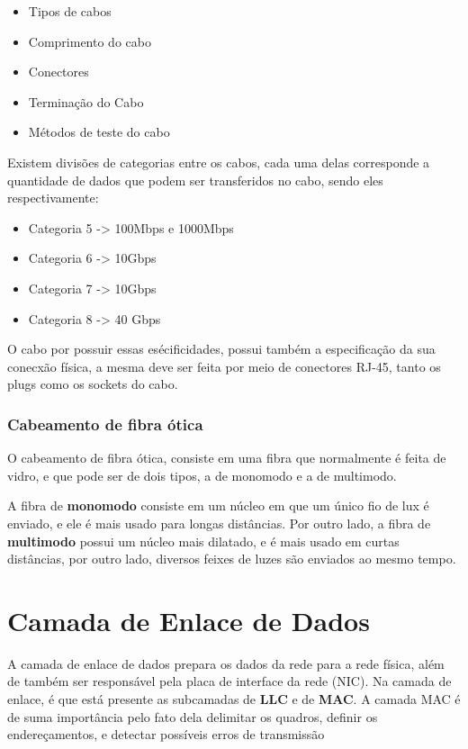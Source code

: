 \documentclass[12pt a4paper]{paper}
\begin{document}
\begin{itemize}
  \item Tipos de cabos 
  \item Comprimento do cabo 
  \item Conectores 
  \item Terminação do Cabo 
  \item Métodos de teste do cabo
\end{itemize}

Existem divisões de categorias entre os cabos, cada uma 
delas corresponde a quantidade de dados que podem ser 
transferidos no cabo, sendo eles respectivamente: 

\begin{itemize}
  \item Categoria 5 -> 100Mbps e 1000Mbps
  \item Categoria 6 -> 10Gbps
  \item Categoria 7 -> 10Gbps 
  \item Categoria 8 -> 40 Gbps 
\end{itemize}

O cabo por possuir essas esécificidades, possui também a 
especificação da sua conecxão física, a mesma deve ser 
feita por meio de conectores RJ-45, tanto os plugs como 
os sockets do cabo.


\subsubsection{Cabeamento de fibra ótica} %
\label{sec:Cabeamento de fibra ótica}
O cabeamento de fibra ótica, consiste em uma fibra que 
normalmente é feita de vidro, e que pode ser de dois tipos, 
a de monomodo e a de multimodo.

A fibra de \textbf{monomodo} consiste em um núcleo em que 
um único fio de lux é enviado, e ele é mais usado para 
longas distâncias. Por outro lado, a fibra de 
\textbf{multimodo} possui um núcleo mais dilatado, e é 
mais usado em curtas distâncias, por outro lado, diversos 
feixes de luzes são enviados ao mesmo tempo.
\newpage
\section{Camada de Enlace de Dados} %
\label{sec:Camada de Enlace de Dados}
A camada de enlace de dados prepara os dados da rede para 
a rede física, além de também ser responsável pela placa de 
interface da rede (NIC).
Na camada de enlace, é que está presente as subcamadas de 
\textbf{LLC} e de \textbf{MAC}. A camada MAC é de suma 
importância pelo fato dela delimitar os quadros, definir 
os endereçamentos, e detectar possíveis erros de transmissão
\end{document}
